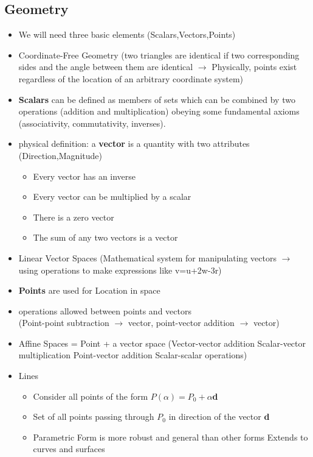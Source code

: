 \documentclass[11pt,a4paper]{article}
\begin{document}
	\subsection{Geometry}
		\begin{itemize}
			\item We will need three basic elements	(Scalars,Vectors,Points)
			\item Coordinate-Free Geometry (two triangles are identical if two corresponding sides and the angle between them are identical $\rightarrow$ Physically, points exist regardless of the location of an arbitrary coordinate system)
			\item \textbf{Scalars} can be defined as members of sets which can be combined by two operations (addition and multiplication) obeying some fundamental axioms (associativity, commutativity, inverses).
			\item physical definition: a \textbf{vector} is a quantity with two attributes (Direction,Magnitude)
				\begin{itemize}
					\item Every vector has an inverse	
					\item Every vector can be multiplied by a scalar	
					\item There is a zero vector	
					\item The sum of any two vectors is a vector
				\end{itemize}
			\item Linear Vector Spaces (Mathematical system for manipulating vectors $\rightarrow$ using operations to make expressions like v=u+2w-3r)
			\item \textbf{Points} are used for Location in space
			\item operations allowed between points and vectors\\ (Point-point subtraction $\rightarrow$ vector, point-vector addition $\rightarrow$ vector)
			\item Affine Spaces = Point + a vector space (Vector-vector addition Scalar-vector multiplication Point-vector addition Scalar-scalar operations)
			\item Lines
				\begin{itemize}
					\item Consider all points of the form $P(\alpha)=P_0 + \alpha$\textbf{d}
					\item Set of all points passing through $P_0$ in direction of the vector \textbf{d}
					\item Parametric Form is more robust and general than other forms Extends to curves and surfaces

\end{itemize}
\end{itemize}
\end{document}
